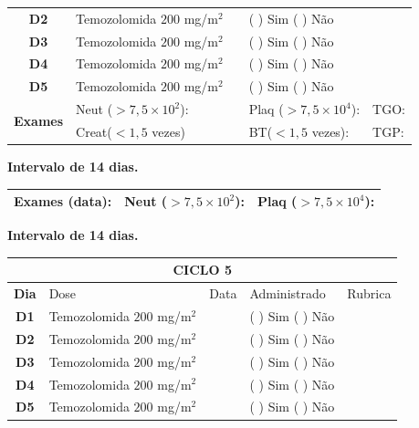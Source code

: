 \documentclass[11pt,a4paper,oldfontcommands]{memoir}
\begin{document}
\begin{center}
\begin{table}[H]
\begin{tabular}{p{1cm}p{5cm}|p{1cm}|p{4.5cm}|p{2cm}}
    \multicolumn{1}{c|}{\multirow{1}{*}{\textbf{D2}}}&{Temozolomida \(200\) mg/m\(^2\)}&&{(  ) Sim (  ) Não}&\\
    \multicolumn{1}{c|}{\multirow{1}{*}{\textbf{D3}}}&{Temozolomida \(200\) mg/m\(^2\)}&&{(  ) Sim (  ) Não}&\\
    \multicolumn{1}{c|}{\multirow{1}{*}{\textbf{D4}}}&{Temozolomida \(200\) mg/m\(^2\)}&&{(  ) Sim (  ) Não}&\\
    \multicolumn{1}{c|}{\multirow{1}{*}{\textbf{D5}}}&{Temozolomida \(200\) mg/m\(^2\)}&&{(  ) Sim (  ) Não}&\\
    \hline
    \multicolumn{1}{c|}{\multirow{2}{*}{\textbf{Exames}}}&\multicolumn{2}{l|}{Neut (\(>7,5\times10^2\)):}&{Plaq (\(>7,5\times10^4\)):}&{TGO:}\\
    \cline{2-5}
    \multicolumn{1}{c|}{\multirow{2}{*}{{}}}&\multicolumn{2}{l|}{Creat(\(<1,5\) vezes)}&{BT(\(<1,5\) vezes):}&{TGP:}
    \\
    \hline
\end{tabular}
\end{table}
\textbf{Intervalo de 14 dias.}
\begin{table}[H]
\begin{tabular}{p{5cm}|p{5cm}|p{4.7cm}}
    \hline
    \textbf{Exames (data):}&{Neut (\(>7,5\times10^2\)):}&{Plaq (\(>7,5\times10^4\)):}
    \\
    \hline
\end{tabular}
\end{table}
\textbf{Intervalo de 14 dias.}
\begin{table}[H]
\begin{tabular}{p{1cm}p{5cm}|p{1cm}|p{4.5cm}|p{2cm}}
	\hline
	\multicolumn{5}{c}{\textbf{CICLO 5}}\\
\hline
    \multicolumn{1}{c|}{\multirow{1}{*}{\textbf{Dia}}}&{Dose}&{Data}&{Administrado}&{Rubrica} \\
    \hline
    \multicolumn{1}{c|}{\multirow{1}{*}{\textbf{D1}}}&{Temozolomida \(200\) mg/m\(^2\)}&&{(  ) Sim (  ) Não}&\\
    \multicolumn{1}{c|}{\multirow{1}{*}{\textbf{D2}}}&{Temozolomida \(200\) mg/m\(^2\)}&&{(  ) Sim (  ) Não}&\\
    \multicolumn{1}{c|}{\multirow{1}{*}{\textbf{D3}}}&{Temozolomida \(200\) mg/m\(^2\)}&&{(  ) Sim (  ) Não}&\\
    \multicolumn{1}{c|}{\multirow{1}{*}{\textbf{D4}}}&{Temozolomida \(200\) mg/m\(^2\)}&&{(  ) Sim (  ) Não}&\\
    \multicolumn{1}{c|}{\multirow{1}{*}{\textbf{D5}}}&{Temozolomida \(200\) mg/m\(^2\)}&&{(  ) Sim (  ) Não}&\\

\end{tabular}
\end{table}
\end{center}
\end{document}
